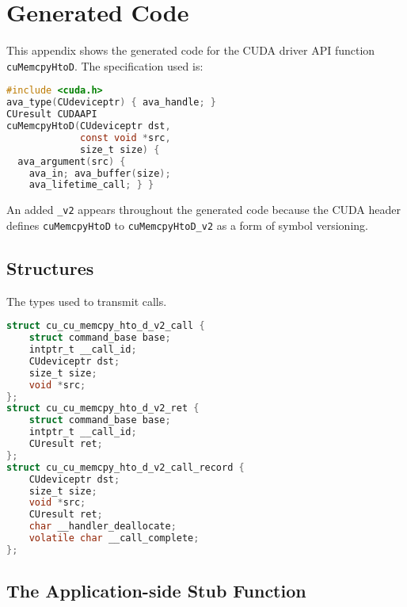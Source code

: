 
\section{\CAvA Generated Code}
\label{app:cuMemcpyHtoD-code}

This appendix shows the generated code for the CUDA driver API function \lstinline|cuMemcpyHtoD|.
The specification used is:

\begin{lstlisting}[language=C,columns=flexible]
#include <cuda.h>
ava_type(CUdeviceptr) { ava_handle; }
CUresult CUDAAPI
cuMemcpyHtoD(CUdeviceptr dst,
             const void *src,
             size_t size) {
  ava_argument(src) {
    ava_in; ava_buffer(size);
    ava_lifetime_call; } }
\end{lstlisting}

An added \lstinline|_v2| appears throughout the generated code because the CUDA header defines \lstinline|cuMemcpyHtoD| to \lstinline|cuMemcpyHtoD_v2| as a form of symbol versioning.



\subsection{Structures}

The types used to transmit calls.


\begin{lstlisting}[language=C,columns=flexible]
struct cu_cu_memcpy_hto_d_v2_call {
    struct command_base base;
    intptr_t __call_id;
    CUdeviceptr dst;
    size_t size;
    void *src;
};
struct cu_cu_memcpy_hto_d_v2_ret {
    struct command_base base;
    intptr_t __call_id;
    CUresult ret;
};
struct cu_cu_memcpy_hto_d_v2_call_record {
    CUdeviceptr dst;
    size_t size;
    void *src;
    CUresult ret;
    char __handler_deallocate;
    volatile char __call_complete;
};
\end{lstlisting}

\subsection{The Application-side Stub Function}

